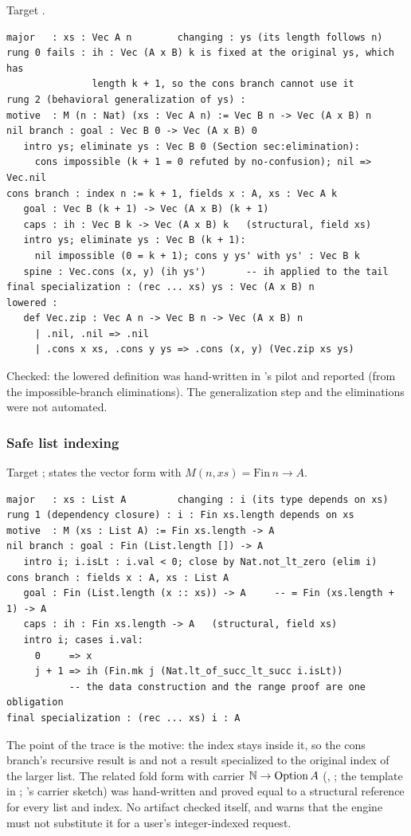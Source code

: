 Target .
\begin{lstlisting}
major   : xs : Vec A n        changing : ys (its length follows n)
rung 0 fails : ih : Vec (A x B) k is fixed at the original ys, which has
               length k + 1, so the cons branch cannot use it
rung 2 (behavioral generalization of ys) :
motive  : M (n : Nat) (xs : Vec A n) := Vec B n -> Vec (A x B) n
nil branch : goal : Vec B 0 -> Vec (A x B) 0
   intro ys; eliminate ys : Vec B 0 (Section sec:elimination):
     cons impossible (k + 1 = 0 refuted by no-confusion); nil => Vec.nil
cons branch : index n := k + 1, fields x : A, xs : Vec A k
   goal : Vec B (k + 1) -> Vec (A x B) (k + 1)
   caps : ih : Vec B k -> Vec (A x B) k   (structural, field xs)
   intro ys; eliminate ys : Vec B (k + 1):
     nil impossible (0 = k + 1); cons y ys' with ys' : Vec B k
   spine : Vec.cons (x, y) (ih ys')       -- ih applied to the tail
final specialization : (rec ... xs) ys : Vec (A x B) n
lowered :
   def Vec.zip : Vec A n -> Vec B n -> Vec (A x B) n
     | .nil, .nil => .nil
     | .cons x xs, .cons y ys => .cons (x, y) (Vec.zip xs ys)
\end{lstlisting}
Checked: the lowered definition was hand-written in 's pilot and reported  (from the impossible-branch eliminations). The generalization step and the eliminations were not automated.

\subsubsection{Safe list indexing}

Target ;  states the vector form  with $M(n, xs) = \mathrm{Fin}\,n \to A$.
\begin{lstlisting}
major   : xs : List A         changing : i (its type depends on xs)
rung 1 (dependency closure) : i : Fin xs.length depends on xs
motive  : M (xs : List A) := Fin xs.length -> A
nil branch : goal : Fin (List.length []) -> A
   intro i; i.isLt : i.val < 0; close by Nat.not_lt_zero (elim i)
cons branch : fields x : A, xs : List A
   goal : Fin (List.length (x :: xs)) -> A     -- = Fin (xs.length + 1) -> A
   caps : ih : Fin xs.length -> A   (structural, field xs)
   intro i; cases i.val:
     0     => x
     j + 1 => ih (Fin.mk j (Nat.lt_of_succ_lt_succ i.isLt))
           -- the data construction and the range proof are one obligation
final specialization : (rec ... xs) i : A
\end{lstlisting}
The point of the trace is the motive: the index stays inside it, so the cons branch's recursive result is  and not a result specialized to the original index of the larger list. The related fold form with carrier $\mathbb{N} \to \mathrm{Option}\,A$ (, ; the template in ; 's carrier sketch) was hand-written and proved equal to a structural reference for every list and index. No artifact checked  itself, and  warns that the engine must not substitute it for a user's integer-indexed request.

